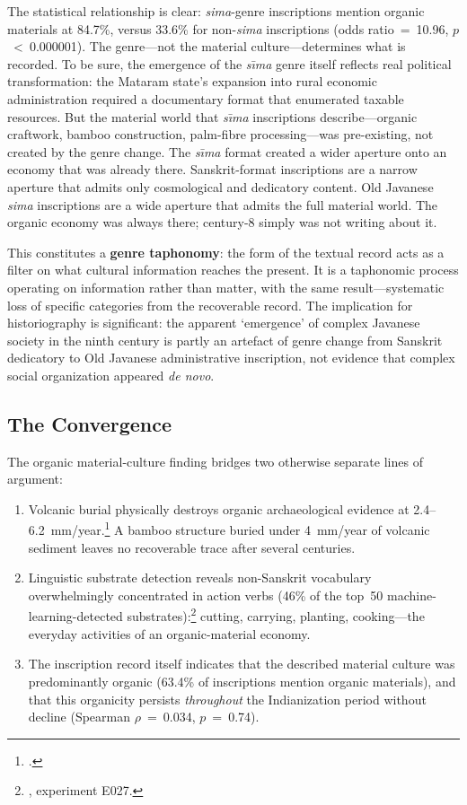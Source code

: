 \documentclass[12pt,a4paper]{article}
\begin{document}
The statistical relationship is clear: \emph{sima}-genre inscriptions mention organic materials at 84.7\%, versus 33.6\% for non-\emph{sima} inscriptions (odds ratio~=~10.96, $p$~<~0.000001). The genre---not the material culture---determines what is recorded. To be sure, the emergence of the \emph{s\={\i}ma} genre itself reflects real political transformation: the Mataram state's expansion into rural economic administration required a documentary format that enumerated taxable resources. But the material world that \emph{s\={\i}ma} inscriptions describe---organic craftwork, bamboo construction, palm-fibre processing---was pre-existing, not created by the genre change. The \emph{s\={\i}ma} format created a wider aperture onto an economy that was already there. Sanskrit-format inscriptions are a narrow aperture that admits only cosmological and dedicatory content. Old Javanese \emph{sima} inscriptions are a wide aperture that admits the full material world. The organic economy was always there; century-8 simply was not writing about it.

This constitutes a \textbf{genre taphonomy}: the form of the textual record acts as a filter on what cultural information reaches the present. It is a taphonomic process operating on information rather than matter, with the same result---systematic loss of specific categories from the recoverable record. The implication for historiography is significant: the apparent `emergence' of complex Javanese society in the ninth century is partly an artefact of genre change from Sanskrit dedicatory to Old Javanese administrative inscription, not evidence that complex social organization appeared \emph{de novo}.

\subsection{The Convergence}

The organic material-culture finding bridges two otherwise separate lines of argument:

\begin{enumerate}
\item Volcanic burial physically destroys organic archaeological evidence at 2.4--6.2~mm/year.\footnote{\autocite{amien2026a}.} A bamboo structure buried under 4~mm/year of volcanic sediment leaves no recoverable trace after several centuries.

\item Linguistic substrate detection reveals non-Sanskrit vocabulary overwhelmingly concentrated in action verbs (46\% of the top~50 machine-learning-detected substrates):\footnote{\autocite{amien2026d}, experiment E027.} cutting, carrying, planting, cooking---the everyday activities of an organic-material economy.

\item The inscription record itself indicates that the described material culture was predominantly organic (63.4\% of inscriptions mention organic materials), and that this organicity persists \emph{throughout} the Indianization period without decline (Spearman $\rho$~=~0.034, $p$~=~0.74).
\end{enumerate}
\end{document}

